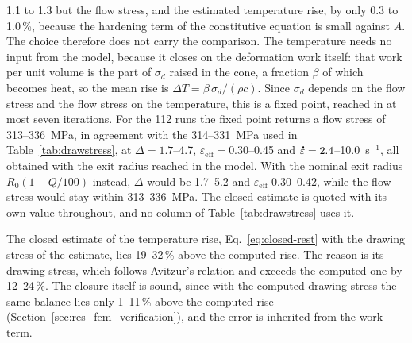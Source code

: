 \documentclass[pdflatex,sn-basic,Numbered]{sn-jnl}
\newcommand{\edot}{\accentset{\scalebox{0.4}{$\bullet$}}{\varepsilon}}
\begin{document}
\begin{appendices}
1.1 to 1.3 but the flow stress, and the estimated temperature rise, by only 0.3 to 1.0\,\%,
because the hardening term of the constitutive equation is small against $A$. The
choice therefore does not carry the comparison. The temperature
needs no input from the model, because it closes on the deformation work itself: that work per
unit volume is the part of $\sigma_d$ raised in the cone, a fraction $\beta$ of which becomes
heat, so the mean rise is $\Delta T = \beta\,\sigma_d/(\rho c)$. Since $\sigma_d$ depends on the
flow stress and the flow stress on the temperature, this is a fixed point, reached in at most
seven iterations. For the
112 runs the fixed point returns a flow stress of 313--336~MPa, in agreement with the
314--331~MPa used in Table~\ref{tab:drawstress}, at $\Delta = 1.7$--4.7,
$\varepsilon_{\mathrm{eff}} = 0.30$--0.45 and $\edot = 2.4$--10.0~s$^{-1}$, all obtained with the exit
radius reached in the model. With the nominal exit radius $R_0(1-Q/100)$ instead, $\Delta$ would be
1.7--5.2 and $\varepsilon_{\mathrm{eff}}$ 0.30--0.42, while the flow stress would stay within
313--336~MPa.
The closed
estimate is quoted with its own value throughout, and no column of Table~\ref{tab:drawstress}
uses it.

The closed estimate of the temperature rise, Eq.~\eqref{eq:closed-rest} with the drawing stress
of the estimate, lies 19--32\,\% above the computed rise. The reason is its drawing stress, which
follows Avitzur's relation and exceeds the computed one by 12--24\,\%. The closure itself is sound,
since with the computed drawing stress the same balance lies only 1--11\,\% above the computed
rise (Section~\ref{sec:res_fem_verification}), and the error is inherited from the work term.













\end{appendices}


\end{document}
